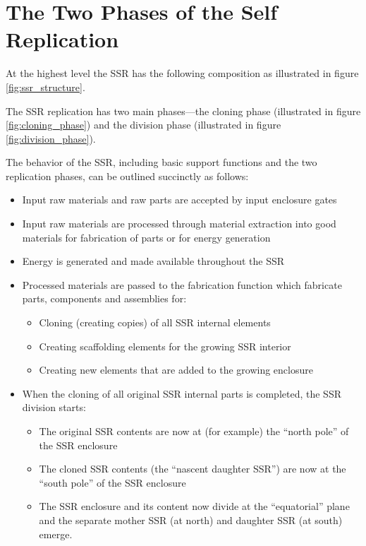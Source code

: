 \section{The Two Phases of the Self Replication}

At the highest level the SSR has the following composition as
illustrated in figure \ref{fig:ssr_structure}.


The SSR replication has two main phases---the cloning phase (illustrated in figure \ref{fig:cloning_phase}) and the division phase (illustrated in figure \ref{fig:division_phase}).



The behavior of the SSR, including basic support functions and the two replication phases, can be outlined succinctly as follows:

\begin{itemize}
\item Input raw materials and raw parts are accepted by input enclosure
gates
\item Input raw materials are processed through material extraction into
good materials for fabrication of parts or for energy generation
\item Energy is generated and made available throughout the SSR
\item Processed materials are passed to the fabrication function which fabricate parts, components and
assemblies for: 

\begin{itemize}
\item Cloning (creating copies) of all SSR internal elements
\item Creating scaffolding elements for the growing SSR interior
\item Creating new elements that are added to the growing enclosure
\end{itemize}
\item When the cloning of all original SSR internal parts is completed,
the SSR division starts:

\begin{itemize}
\item The original SSR contents are now at (for example) the “north pole”
of the SSR enclosure
\item The cloned SSR contents (the “nascent daughter SSR”) are now at the
“south pole” of the SSR enclosure
\item The SSR enclosure and its content now divide at the “equatorial”
plane and the separate mother SSR (at north) and daughter SSR (at south)
emerge.
\end{itemize}
\end{itemize}

